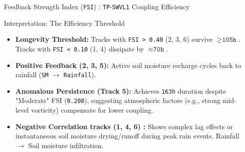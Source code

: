 \documentclass[8pt, aspectratio=169]{beamer}
\begin{document}
\begin{frame}{Feedback Strength Index (\texttt{FSI}) : \texttt{TP}-\texttt{SWVL1} Coupling Efficiency}
\begin{center}
        \vspace{0.3cm}
        \begin{block}{Interpretation: \footnotesize The Efficiency Threshold}
            \footnotesize
            \begin{itemize}
               \item \textbf{Longevity Threshold:} Tracks with \texttt{FSI > 0.40} (2, 3, 6) survive $\geq \texttt{105h}$. Tracks with \texttt{FSI < 0.10} (1, 4) dissipate by $\approx \texttt{70h}$.
               \item \textbf{Positive Feedback (2, 3, 5):} Active soil moisture recharge cycles back to rainfall (\texttt{SM} $\rightarrow$ \texttt{Rainfall}).
               \item \textbf{Anomalous Persistence (Track 5):} Achieves \texttt{163h} duration despite "Moderate" FSI (\texttt{0.208}), suggesting atmospheric factors (e.g., strong mid-level vorticity) compensate for lower coupling.

               \item \textbf{Negative Correlation tracks (1, 4, 6) :} Shows complex lag effects or instantaneous soil moisture drying/runoff during peak rain events. Rainfall $\rightarrow$ Soil moisture infiltration. \cite{clapp1978empirical}
            \end{itemize}
        \end{block}
    \end{center}
\end{frame}
\end{document}
